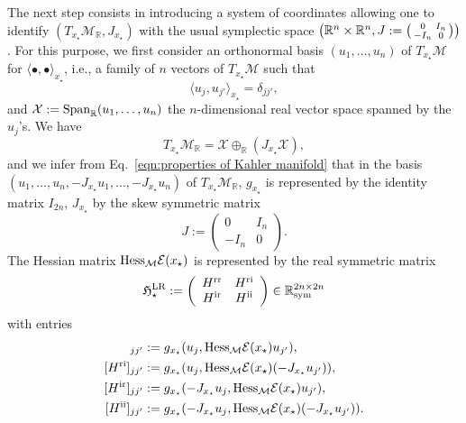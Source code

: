 \documentclass[11pt]{article}
\def\R{{\mathbb R}}
\newcommand{\EC}[1]{{\color{red}[EC's comment: #1]}}
\begin{document}
\par
The next step consists in introducing a system of coordinates allowing one to identify $(T_{x_\star} \mathcal M_\R,J_{x_\star})$ with the usual symplectic space $\big( \R^n \times \R^n, J := \begin{psmallmatrix} 0 & I_n \\ -I_n & 0 \end{psmallmatrix}\big)$. For this purpose, we first consider an orthonormal basis $(u_1,\ldots, u_n)$  of $T_{x_\star}\mathcal M$ for $\langle \bullet,\bullet \rangle_{x_\star}$, i.e., a family of $n$ vectors of $T_{x_\star}\mathcal M$ such that
$$
\langle u_j,u_{j'} \rangle_{x_\star} = \delta_{jj'},
$$
and $\mathcal X:={\rm Span}_\R(u_1,\ldots,u_n)$ the $n$-dimensional real vector space spanned by the $u_j$'s. We have
$$
T_{x_\star}\mathcal M_\R = \mathcal X \oplus_\R (J_{x_\star}\mathcal X),
$$
and we infer from Eq.~\eqref{eqn:properties of Kahler manifold} that in the basis $(u_1,\ldots,u_n,{-J_{x_\star}u_1,\ldots,-J_{x_\star}u_n})$ of $T_{x_\star}\mathcal M_\R$, $g_{x_\star}$ is represented by the identity matrix $I_{2n}$, $J_{x_\star}$ by the skew symmetric matrix
$$J:=\begin{pmatrix}
    0 & I_n \\
    -I_n & 0
\end{pmatrix}.
$$
The Hessian matrix ${\rm Hess}_{\mathcal M}\mathcal E(x_\star)$ is represented by the real symmetric matrix
\begin{equation} \label{eq:matrix_H*}
    \mathfrak H_\star^{\rm LR} := \left( \begin{array}{cc} H^{\rm rr} & H^{\rm ri} \\ H^{\rm ir} &   H^{\rm ii} \end{array} \right) \in \R^{2n \times 2n}_{\rm sym}
\end{equation}
with entries
\begin{align}
[H^{\rm rr}]_{jj'} &:= g_{x_\star}(u_j,{\rm Hess}_{\mathcal M}\mathcal E(x_\star) u_{j'}),  \label{eq:Hrr} \\
[H^{\rm ri}]_{jj'} &:= g_{x_\star}(u_j,{\rm Hess}_{\mathcal M}\mathcal E(x_\star) (-J_{x_\star} u_{j'})), \\
[H^{\rm ir}]_{jj'} &:= g_{x_\star}(-J_{x_\star}u_j,{\rm Hess}_{\mathcal M}\mathcal E(x_\star) u_{j'}), \\
[H^{\rm ii}]_{jj'} &:= g_{x_\star}(-J_{x_\star}u_j,{\rm Hess}_{\mathcal M} \mathcal E(x_\star) (-J_{x_\star}u_{j'})). \label{eq:Hii}
\end{align}
\end{document}
